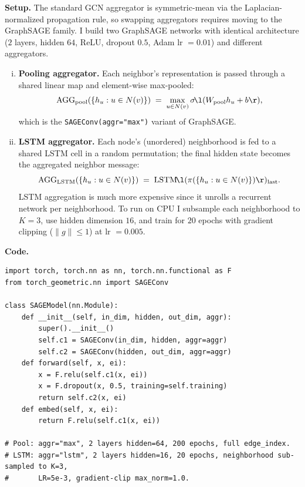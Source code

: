 \documentclass{article}
\begin{document}
\begin{tcolorbox}[colback=white, colframe=black!75, breakable, title=\textbf{Solution to Exercise 4}]
\textbf{Setup.} The standard GCN aggregator is symmetric-mean via the Laplacian-normalized propagation rule, so swapping aggregators requires moving to the GraphSAGE family. I build two GraphSAGE networks with identical architecture ($2$ layers, hidden $64$, ReLU, dropout $0.5$, Adam lr $=0.01$) and different aggregators.

\begin{enumerate}[(i)]
\item \textbf{Pooling aggregator.} Each neighbor's representation is passed through a shared linear map and element-wise max-pooled:
\[
\text{AGG}_{\text{pool}}(\{h_u:u\in N(v)\}) \;=\; \max_{u\in N(v)}\sigma\!\l(W_{\text{pool}}h_u+b\r),
\]
which is the \texttt{SAGEConv(aggr="max")} variant of GraphSAGE.
\item \textbf{LSTM aggregator.} Each node's (unordered) neighborhood is fed to a shared LSTM cell in a random permutation; the final hidden state becomes the aggregated neighbor message:
\[
\text{AGG}_{\text{LSTM}}(\{h_u:u\in N(v)\}) \;=\; \text{LSTM}\!\l(\pi(\{h_u:u\in N(v)\})\r)_{\text{last}}.
\]
LSTM aggregation is much more expensive since it unrolls a recurrent network per neighborhood. To run on CPU I subsample each neighborhood to $K=3$, use hidden dimension $16$, and train for $20$ epochs with gradient clipping ($\|g\|\le 1$) at lr $=0.005$.
\end{enumerate}

\medskip
\textbf{Code.}
\begin{lstlisting}[style=python2]
import torch, torch.nn as nn, torch.nn.functional as F
from torch_geometric.nn import SAGEConv

class SAGEModel(nn.Module):
    def __init__(self, in_dim, hidden, out_dim, aggr):
        super().__init__()
        self.c1 = SAGEConv(in_dim, hidden, aggr=aggr)
        self.c2 = SAGEConv(hidden, out_dim, aggr=aggr)
    def forward(self, x, ei):
        x = F.relu(self.c1(x, ei))
        x = F.dropout(x, 0.5, training=self.training)
        return self.c2(x, ei)
    def embed(self, x, ei):
        return F.relu(self.c1(x, ei))

# Pool: aggr="max", 2 layers hidden=64, 200 epochs, full edge_index.
# LSTM: aggr="lstm", 2 layers hidden=16, 20 epochs, neighborhood sub-sampled to K=3,
#       LR=5e-3, gradient-clip max_norm=1.0.
\end{lstlisting}


\end{tcolorbox}
\end{document}
